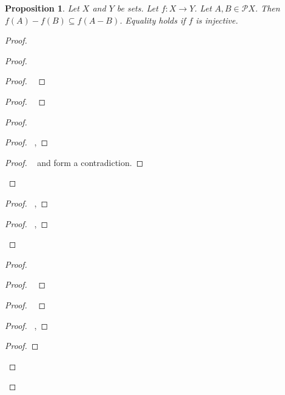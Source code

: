 \documentclass{report}
\newtheorem{prop}[ax]{Proposition}
\theoremstyle{definition}
\begin{document}
\begin{prop}
Let $X$ and $Y$ be sets. Let $f : X \rightarrow Y$. Let $A,B \in \mathcal{P} X$. Then $f(A) - f(B) \subseteq f(A - B)$. Equality holds if $f$ is injective.
\end{prop}

\begin{proof}
\pf
{}
\begin{proof}
	\begin{proof}
		\pf\ 
	\end{proof}
	\begin{proof}
		\pf\ 
	\end{proof}
	\begin{proof}
		\begin{proof}
			\pf\ , 
		\end{proof}
		\qedstep
		\begin{proof}
			\pf\  and  form a contradiction.
		\end{proof}
	\end{proof}
	\begin{proof}
		\pf\ , 
	\end{proof}
	\begin{proof}
		\pf\ , 
	\end{proof}
\end{proof}
\begin{proof}
	\begin{proof}
		\pf\ 
	\end{proof}
	\begin{proof}
		\pf\ 
	\end{proof}
	\begin{proof}
		\pf\ , 
	\end{proof}
	\begin{proof}

\end{proof}
\end{proof}
\end{proof}
\end{document}
